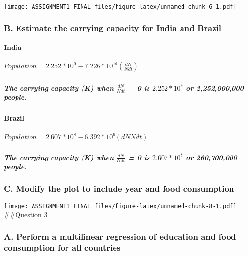 \documentclass[]{article}
\let\oldparagraph\paragraph
\renewcommand{\paragraph}[1]{\oldparagraph{#1}\mbox{}}
\let\oldsubparagraph\subparagraph
\renewcommand{\subparagraph}[1]{\oldsubparagraph{#1}\mbox{}}
\begin{document}
\texttt{[image: ASSIGNMENT1\_FINAL\_files/figure-latex/unnamed-chunk-6-1.pdf]}

\subsubsection{B. Estimate the carrying capacity for India and
Brazil}\label{b.-estimate-the-carrying-capacity-for-india-and-brazil}

\paragraph{India}\label{india}

\subparagraph{\texorpdfstring{\(Population = 2.252*10^9 - 7.226*10^{10}(\frac{dN}{Ndt})\)}{Population = 2.252*10\^{}9 - 7.226*10\^{}\{10\}(\textbackslash{}frac\{dN\}\{Ndt\})}}\label{population-2.252109---7.2261010fracdnndt}

\subparagraph{\texorpdfstring{The carrying capacity (K) when
\(\frac{dN}{Ndt}\) = 0 is \(2.252*10^9\) or 2,252,000,000
people.}{The carrying capacity (K) when \textbackslash{}frac\{dN\}\{Ndt\} = 0 is 2.252*10\^{}9 or 2,252,000,000 people.}}\label{the-carrying-capacity-k-when-fracdnndt-0-is-2.252109-or-2252000000-people.}

\paragraph{Brazil}\label{brazil}

\subparagraph{\texorpdfstring{\(Population = 2.607*10^8 - 6.392*10^9(dNNdt)\)}{Population = 2.607*10\^{}8 - 6.392*10\^{}9(dNNdt)}}\label{population-2.607108---6.392109dnndt}

\subparagraph{\texorpdfstring{The carrying capacity (K) when
\(\frac{dN}{Ndt}\) = 0 is \(2.607*10^8\) or 260,700,000
people.}{The carrying capacity (K) when \textbackslash{}frac\{dN\}\{Ndt\} = 0 is 2.607*10\^{}8 or 260,700,000 people.}}\label{the-carrying-capacity-k-when-fracdnndt-0-is-2.607108-or-260700000-people.}

\subsubsection{C. Modify the plot to include year and food
consumption}\label{c.-modify-the-plot-to-include-year-and-food-consumption}

\texttt{[image: ASSIGNMENT1\_FINAL\_files/figure-latex/unnamed-chunk-8-1.pdf]}
\#\#Question 3

\subsubsection{A. Perform a multilinear regression of education and food
consumption for all
countries}\label{a.-perform-a-multilinear-regression-of-education-and-food-consumption-for-all-countries}
\end{document}
